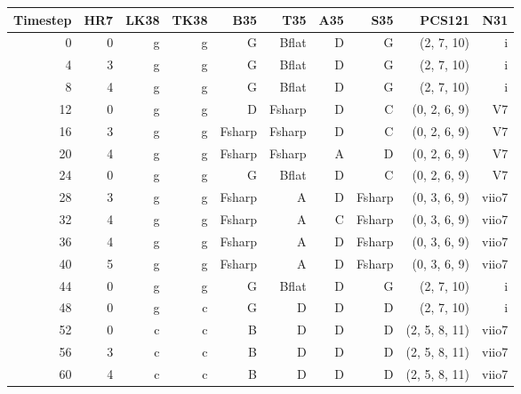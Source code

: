 \begin{tabular}{r|rrrrrrrrr}
    Timestep & HR7 & LK38 & TK38 & B35          & T35          & A35         & S35          & PCS121        & N31   \\ \hline
0        & 0   & g    & g    & G            & B\gls{flat}  & D           & G            & (2, 7, 10)    & i     \\
4        & 3   & g    & g    & G            & B\gls{flat}  & D           & G            & (2, 7, 10)    & i     \\
8        & 4   & g    & g    & G            & B\gls{flat}  & D           & G            & (2, 7, 10)    & i     \\
12       & 0   & g    & g    & D            & F\gls{sharp} & D           & C            & (0, 2, 6, 9)  & V7    \\
16       & 3   & g    & g    & F\gls{sharp} & F\gls{sharp} & D           & C            & (0, 2, 6, 9)  & V7    \\
20       & 4   & g    & g    & F\gls{sharp} & F\gls{sharp} & A           & D            & (0, 2, 6, 9)  & V7    \\ \hline
24       & 0   & g    & g    & G            & B\gls{flat}  & D           & C            & (0, 2, 6, 9)  & V7    \\
28       & 3   & g    & g    & F\gls{sharp} & A            & D           & F\gls{sharp} & (0, 3, 6, 9)  & viio7 \\
32       & 4   & g    & g    & F\gls{sharp} & A            & C           & F\gls{sharp} & (0, 3, 6, 9)  & viio7 \\
36       & 4   & g    & g    & F\gls{sharp} & A            & D           & F\gls{sharp} & (0, 3, 6, 9)  & viio7 \\
40       & 5   & g    & g    & F\gls{sharp} & A            & D           & F\gls{sharp} & (0, 3, 6, 9)  & viio7 \\
44       & 0   & g    & g    & G            & B\gls{flat}  & D           & G            & (2, 7, 10)    & i     \\ \hline
48       & 0   & g    & c    & G            & D            & D           & D            & (2, 7, 10)    & i     \\
52       & 0   & c    & c    & B            & D            & D           & D            & (2, 5, 8, 11) & viio7 \\
56       & 3   & c    & c    & B            & D            & D           & D            & (2, 5, 8, 11) & viio7 \\
60       & 4   & c    & c    & B            & D            & D           & D            & (2, 5, 8, 11) & viio7 \\

\end{tabular}

